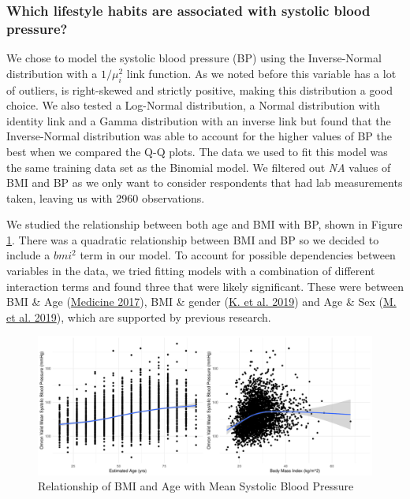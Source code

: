 \documentclass[
  11pt,
  twocolumn]{article}
\begin{document}
\hypertarget{which-lifestyle-habits-are-associated-with-systolic-blood-pressure}{%
\subsubsection{Which lifestyle habits are associated with systolic blood
pressure?}\label{which-lifestyle-habits-are-associated-with-systolic-blood-pressure}}

We chose to model the systolic blood pressure (BP) using the
Inverse-Normal distribution with a \(1/\mu_i^2\) link function. As we
noted before this variable has a lot of outliers, is right-skewed and
strictly positive, making this distribution a good choice. We also
tested a Log-Normal distribution, a Normal distribution with identity
link and a Gamma distribution with an inverse link but found that the
Inverse-Normal distribution was able to account for the higher values of
BP the best when we compared the Q-Q plots. The data we used to fit this
model was the same training data set as the Binomial model. We filtered
out \emph{NA} values of BMI and BP as we only want to consider
respondents that had lab measurements taken, leaving us with 2960
observations.

We studied the relationship between both age and BMI with BP, shown in
Figure \ref{fig:output-relationship-plots}. There was a quadratic
relationship between BMI and BP so we decided to include a \(bmi^2\)
term in our model. To account for possible dependencies between
variables in the data, we tried fitting models with a combination of
different interaction terms and found three that were likely
significant. These were between BMI \& Age
(\protect\hyperlink{ref-AgeBMI}{Medicine 2017}), BMI \& gender
(\protect\hyperlink{ref-SexBMI}{K. et al. 2019}) and Age \& Sex
(\protect\hyperlink{ref-AgeSex}{M. et al. 2019}), which are supported by
previous research.

\begin{figure}[H]
\includegraphics{Coursework_files/figure-latex/output-relationship-plots-1} \caption{Relationship of BMI and Age with Mean Systolic Blood Pressure}\label{fig:output-relationship-plots}
\end{figure}
\end{document}
